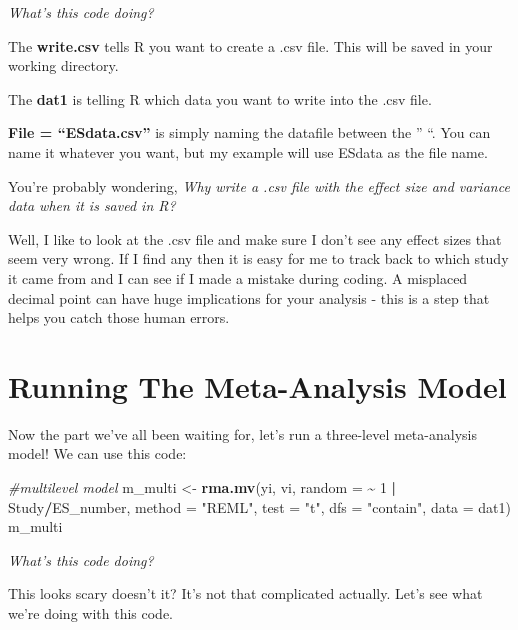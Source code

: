\documentclass[
]{book}
\newenvironment{Shaded}{\begin{snugshade}}{\end{snugshade}}
\newcommand{\AttributeTok}[1]{\textcolor[rgb]{0.13,0.29,0.53}{#1}}
\newcommand{\CommentTok}[1]{\textcolor[rgb]{0.56,0.35,0.01}{\textit{#1}}}
\newcommand{\DecValTok}[1]{\textcolor[rgb]{0.00,0.00,0.81}{#1}}
\newcommand{\FunctionTok}[1]{\textcolor[rgb]{0.13,0.29,0.53}{\textbf{#1}}}
\newcommand{\NormalTok}[1]{#1}
\newcommand{\OtherTok}[1]{\textcolor[rgb]{0.56,0.35,0.01}{#1}}
\newcommand{\SpecialCharTok}[1]{\textcolor[rgb]{0.81,0.36,0.00}{\textbf{#1}}}
\newcommand{\StringTok}[1]{\textcolor[rgb]{0.31,0.60,0.02}{#1}}
\begin{document}
\emph{What's this code doing?}

The \textbf{write.csv} tells R you want to create a .csv file. This will be saved in your working directory.

The \textbf{dat1} is telling R which data you want to write into the .csv file.

\textbf{File = ``ESdata.csv''} is simply naming the datafile between the '' ``. You can name it whatever you want, but my example will use ESdata as the file name.

You're probably wondering, \emph{Why write a .csv file with the effect size and variance data when it is saved in R?}

Well, I like to look at the .csv file and make sure I don't see any effect sizes that seem very wrong. If I find any then it is easy for me to track back to which study it came from and I can see if I made a mistake during coding. A misplaced decimal point can have huge implications for your analysis - this is a step that helps you catch those human errors.

\hypertarget{running-the-meta-analysis-model-1}{%
\section{Running The Meta-Analysis Model}\label{running-the-meta-analysis-model-1}}

Now the part we've all been waiting for, let's run a three-level meta-analysis model! We can use this code:

\begin{Shaded}
\begin{Highlighting}[]
\CommentTok{\#multilevel model}
\NormalTok{m\_multi }\OtherTok{\textless{}{-}} \FunctionTok{rma.mv}\NormalTok{(yi,}
\NormalTok{                  vi,}
                  \AttributeTok{random =} \SpecialCharTok{\textasciitilde{}} \DecValTok{1} \SpecialCharTok{|}\NormalTok{ Study}\SpecialCharTok{/}\NormalTok{ES\_number,}
                  \AttributeTok{method =} \StringTok{"REML"}\NormalTok{,}
                  \AttributeTok{test =} \StringTok{"t"}\NormalTok{,}
                  \AttributeTok{dfs =} \StringTok{"contain"}\NormalTok{,}
                  \AttributeTok{data =}\NormalTok{ dat1) }
\NormalTok{m\_multi}
\end{Highlighting}
\end{Shaded}

\emph{What's this code doing?}

This looks scary doesn't it? It's not that complicated actually. Let's see what we're doing with this code.
\end{document}
